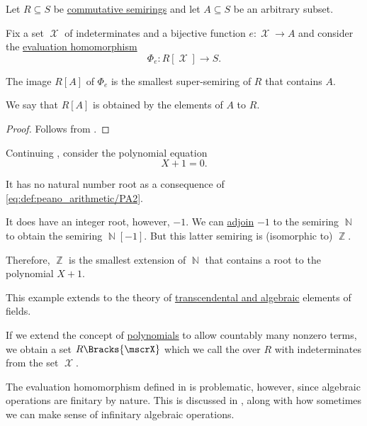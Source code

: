 \begin{proposition}\label{thm:adjoining_elements_to_semiring}
  Let \( R \subseteq S \) be \hyperref[def:semiring/commutative]{commutative semirings} and let \( A \subseteq S \) be an arbitrary subset.

  Fix a set \( \mscrX \) of indeterminates and a bijective function \( e: \mscrX \to A \) and consider the \hyperref[thm:polynomial_algebra_universal_property]{evaluation homomorphism}
  \begin{equation*}
    \Phi_e: R[\mscrX] \to S.
  \end{equation*}

  The image \( R[A] \) of \( \Phi_e \) is the smallest super-semiring of \( R \) that contains \( A \).

  We say that \( R[A] \) is obtained by  the elements of \( A \) to \( R \).
\end{proposition}
\begin{proof}
  Follows from .
\end{proof}

\begin{example}\label{ex:adjoining_root}
  Continuing , consider the polynomial equation
  \begin{equation*}
    X + 1 = 0.
  \end{equation*}

  It has no natural number root as a consequence of \eqref{eq:def:peano_arithmetic/PA2}.

  It does have an integer root, however, \( -1 \). We can \hyperref[thm:adjoining_elements_to_semiring]{adjoin} \( -1 \) to the semiring \( \BbbN \) to obtain the semiring \( \BbbN[-1] \). But this latter semiring is (isomorphic to) \( \BbbZ \).

  Therefore, \( \BbbZ \) is the smallest extension of \( \BbbN \) that contains a root to the polynomial \( X + 1 \).

  This example extends to the theory of \hyperref[def:transcendental_element]{transcendental and algebraic} elements of fields.
\end{example}

\begin{definition}\label{def:formal_power_series}\mimprovised
  If we extend the concept of \hyperref[def:polynomial_algebra]{polynomials} to allow countably many nonzero terms, we obtain a set \( R\Bracks{\mscrX} \) which we call the  over \( R \) with indeterminates from the set \( \mscrX \).

  The evaluation homomorphism defined in  is problematic, however, since algebraic operations are finitary by nature. This is discussed in , along with how sometimes we can make sense of infinitary algebraic operations.
\end{definition}
